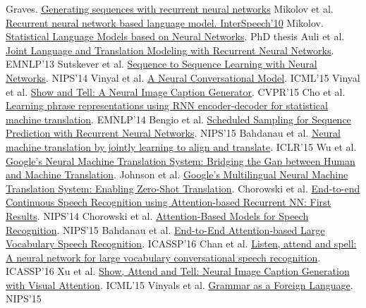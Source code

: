 \documentclass[UTF8,10pt,a4paper]{ctexbook}
\begin{document}
\begin{itemize}
\subitem Graves. \href{https://arxiv.org/abs/1308.0850}{Generating sequences with recurrent neural networks}
\subitem Mikolov et al. \href{http://isca-speech.org/archive/archive_papers/interspeech_2010/i10_1045.pdf}{Recurrent neural network based language model. InterSpeech’10}
\subitem Mikolov. \href{http://deeplearning.cs.cmu.edu/pdfs/1030/Mikolov_Thesis.pdf}{Statistical Language Models based on Neural Networks}. PhD thesis 
\subitem Auli et al. \href{https://www.microsoft.com/en-us/research/wp-content/uploads/2016/02/EMNLP2013RNNMT.pdf}{Joint Language and Translation Modeling with Recurrent Neural Networks}. EMNLP’13
\subitem Sutskever et al. \href{https://arxiv.org/abs/1409.3215}{Sequence to Sequence Learning with Neural Networks}. NIPS’14 
\subitem Vinyal et al. \href{https://arxiv.org/abs/1506.05869}{A Neural Conversational Model}. ICML’15 
\subitem Vinyal et al. \href{https://arxiv.org/abs/1411.4555}{Show and Tell: A Neural Image Caption Generator}. CVPR’15 
\subitem Cho et al. \href{https://arxiv.org/abs/1406.1078}{Learning phrase representations using RNN encoder-decoder for statistical machine translation}. EMNLP’14 
\subitem Bengio et al. \href{https://arxiv.org/abs/1506.03099}{Scheduled Sampling for Sequence Prediction with Recurrent Neural Networks}. NIPS’15 
\subitem Bahdanau et al. \href{https://arxiv.org/abs/1409.0473}{Neural machine translation by jointly learning to align and translate}. ICLR’15 
\subitem Wu et al. \href{https://arxiv.org/abs/1609.08144}{Google’s Neural Machine Translation System: Bridging the Gap between Human and Machine Translation}. 
\subitem Johnson et al. \href{https://arxiv.org/abs/1611.04558}{Google’s Multilingual Neural Machine Translation System: Enabling Zero-Shot Translation}.
\subitem Chorowski et al. \href{https://arxiv.org/abs/1412.1602}{End-to-end Continuous Speech Recognition using Attention-based Recurrent NN: First Results}. NIPS’14 
\subitem Chorowski et al. \href{https://arxiv.org/abs/1506.07503}{Attention-Based Models for Speech Recognition}. NIPS’15 
\subitem Bahdanau et al. \href{https://arxiv.org/abs/1508.04395}{End-to-End Attention-based Large Vocabulary Speech Recognition}. ICASSP’16
\subitem Chan et al. \href{http://mirlab.org/conference_papers/International_Conference/ICASSP\%202016/pdfs/0004960.pdf}{Listen, attend and spell: A neural network for large vocabulary conversational speech recognition}. ICASSP’16 
\subitem Xu et al. \href{https://arxiv.org/abs/1502.03044}{Show, Attend and Tell: Neural Image Caption Generation with Visual Attention}. ICML’15 
\subitem Vinyals et al. \href{https://arxiv.org/abs/1412.7449}{Grammar as a Foreign Language}. NIPS’15 

\end{itemize}
\end{document}
